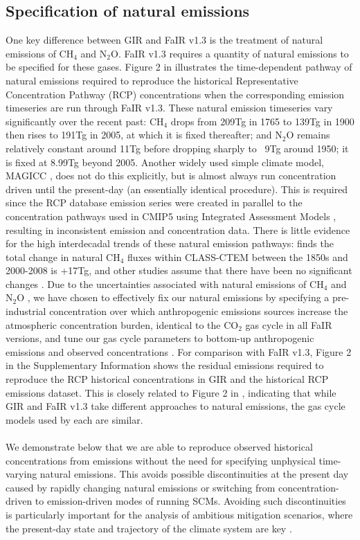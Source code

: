 \documentclass[gmd, manuscript]{copernicus}
\begin{document}
\subsection*{Specification of natural emissions}
One key difference between GIR and FaIR v1.3 is the treatment of natural emissions of CH$_4$ and N$_2$O. FaIR v1.3 requires a quantity of natural emissions to be specified for these gases. Figure 2 in \cite{Smith2017} illustrates the time-dependent pathway of natural emissions required to reproduce the historical Representative Concentration Pathway (RCP) concentrations when the corresponding emission timeseries \citep{Meinshausen2011c} are run through FaIR v1.3. These natural emission timeseries vary significantly over the recent past: CH$_4$ drops from 209Tg in 1765 to 139Tg in 1900 then rises to 191Tg in 2005, at which it is fixed thereafter; and N$_2$O remains relatively constant around 11Tg before dropping sharply to ~9Tg around 1950; it is fixed at 8.99Tg beyond 2005. Another widely used simple climate model, MAGICC \citep{Meinshausen2011}, does not do this explicitly, but is almost always run concentration driven until the present-day (an essentially identical procedure). This is required since the RCP database emission series were created in parallel to the concentration pathways used in CMIP5 using Integrated Assessment Models \citep{Moss2010}, resulting in inconsistent emission and concentration data. There is little evidence for the high interdecadal trends of these natural emission pathways: \cite{Arora2018} finds the total change in natural CH$_4$ fluxes within CLASS-CTEM between the 1850s and 2000-2008 is +17Tg, and other studies assume that there have been no significant changes \citep{Holmes2013,Prather2012}. Due to the uncertainties associated with natural emissions of CH$_4$ and N$_2$O \citep{Turner2019,Davidson2014}, we have chosen to effectively fix our natural emissions by specifying a pre-industrial concentration over which anthropogenic emissions sources increase the atmospheric concentration burden, identical to the CO$_2$ gas cycle in all FaIR versions, and tune our gas cycle parameters to bottom-up anthropogenic emissions \citep{Gutschow2016,Quere2018} and observed concentrations \citep{Meinshausen2017}. For comparison with FaIR v1.3, Figure 2 in the Supplementary Information shows the residual emissions required to reproduce the RCP historical concentrations in GIR and the historical RCP emissions dataset. This is closely related to Figure 2 in \cite{Smith2017}, indicating that while GIR and FaIR v1.3 take different approaches to natural emissions, the gas cycle models used by each are similar.\\\\
We demonstrate below that we are able to reproduce observed historical concentrations from emissions without the need for specifying unphysical time-varying natural emissions. This avoids possible discontinuities at the present day caused by rapidly changing natural emissions or switching from concentration-driven to emission-driven modes of running SCMs. Avoiding such discontinuities is particularly important for the analysis of ambitious mitigation scenarios, where the present-day state and trajectory of the climate system are key \citep{Leach2018}.
\end{document}
